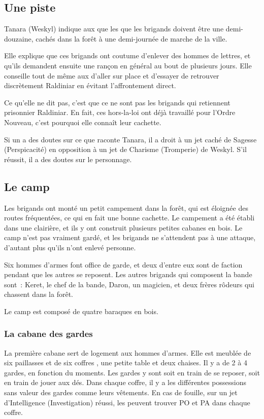 \documentclass[a4paper,10pt,openany]{book}
\begin{document}
\begin{multicols}{2}
\subsection{Une piste}
Tanara (Weskyl) indique aux \PJs que les  que les brigands doivent être une demi-douzaine, cachés dans la forêt à une demi-journée de marche de
la ville. \par Elle explique que ces brigands ont coutume d’enlever des hommes de lettres, et qu’ils demandent ensuite une rançon en général au bout
de plusieurs jours. Elle conseille tout de même aux \PJs d’aller sur place et d’essayer de retrouver discrètement Raldiniar en évitant l’affrontement
direct.\par Ce qu’elle ne dit pas, c’est que ce ne sont pas les brigands qui retiennent prisonnier Raldiniar. En fait, ces hors-la-loi ont déjà
travaillé pour l’Ordre Nouveau, c’est pourquoi elle connaît leur cachette.\par Si un \PJ a des doutes sur ce que raconte Tanara, il a droit à un jet
caché de Sagesse (Perspicacité) en opposition à un jet de Charisme (Tromperie) de Weskyl. S’il réussit, il a des doutes sur le personnage.
\subsection{Le camp}
Les brigands ont monté un petit campement dans la forêt, qui est éloignée des routes fréquentées, ce qui en fait une bonne cachette. Le campement a
été établi dans une clairière, et ils y ont construit plusieurs petites cabanes en bois. Le camp n’est pas vraiment gardé, et les brigands ne
s’attendent pas à une attaque, d’autant plus qu’ils n’ont enlevé personne.\par Six hommes d’armes font office de garde, et deux d’entre eux sont de
faction pendant que les autres se reposent. Les autres brigands qui composent la bande sont : Keret, le chef de la bande, Daron, un magicien, et deux
frères rôdeurs qui chassent dans la forêt. \par Le camp est composé de quatre baraques en bois.
\subsubsection{La cabane des gardes} 
La première cabane sert de logement aux hommes d’armes. Elle est meublée de six paillasses et de six coffres , une petite table et deux chaises. Il y
a de 2 à 4 gardes, en fonction du moments. Les gardes y sont soit en train de se reposer, soit en train de jouer aux dés. Dans chaque coffre, il y a
les différentes possessions sans valeur des gardes comme leurs vêtements. En cas de fouille, sur un jet d’Intelligence (Investigation) réussi, les
\PJs peuvent trouver  PO et  PA dans chaque coffre.

\end{multicols}
\end{document}
